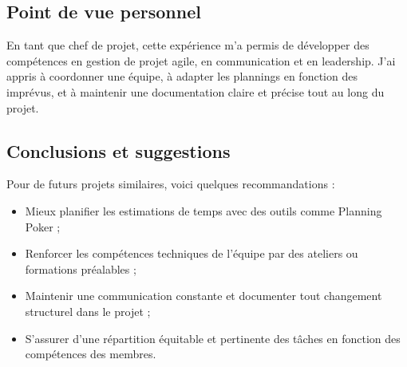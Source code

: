 \documentclass[a4paper]{article}
\begin{document}
\subsection{Point de vue personnel}
En tant que chef de projet, cette expérience m'a permis de développer des compétences en gestion de projet agile, en communication et en leadership. J'ai appris à coordonner une équipe, à adapter les plannings en fonction des imprévus, et à maintenir une documentation claire et précise tout au long du projet.

\subsection{Conclusions et suggestions}
Pour de futurs projets similaires, voici quelques recommandations :
\begin{itemize}
    \item Mieux planifier les estimations de temps avec des outils comme Planning Poker ;
    \item Renforcer les compétences techniques de l'équipe par des ateliers ou formations préalables ;
    \item Maintenir une communication constante et documenter tout changement structurel dans le projet ;
    \item S'assurer d'une répartition équitable et pertinente des tâches en fonction des compétences des membres.
\end{itemize}
\end{document}
